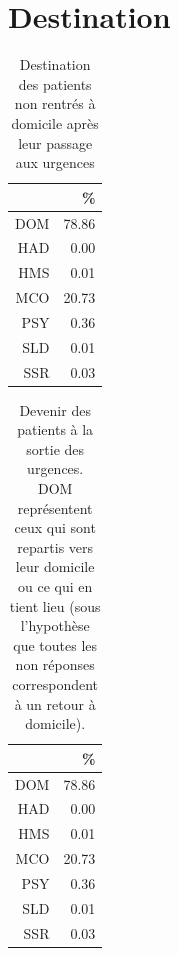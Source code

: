 \documentclass[12pt,english,french,twoside]{report}\usepackage[]{graphicx}\usepackage[]{color}
\begin{document}
\section{Destination}
\begin{table}[ht]
\centering
\begin{tabular}{rr}
  \hline
 & \% \\ 
  \hline
DOM & 78.86 \\ 
  HAD & 0.00 \\ 
  HMS & 0.01 \\ 
  MCO & 20.73 \\ 
  PSY & 0.36 \\ 
  SLD & 0.01 \\ 
  SSR & 0.03 \\ 
   \hline
\end{tabular}
\caption{Destination des patients non rentrés à domicile après leur passage aux urgences} 
\label{tab.dest.hosp}
\end{table}
\begin{table}[ht]
\centering
\begin{tabular}{rr}
  \hline
 & \% \\ 
  \hline
DOM & 78.86 \\ 
  HAD & 0.00 \\ 
  HMS & 0.01 \\ 
  MCO & 20.73 \\ 
  PSY & 0.36 \\ 
  SLD & 0.01 \\ 
  SSR & 0.03 \\ 
   \hline
\end{tabular}
\caption{Devenir des patients à la sortie des urgences. DOM représentent ceux qui sont repartis vers leur domicile ou ce qui en tient lieu (sous l'hypothèse que toutes les non réponses correspondent à un retour à domicile).} 
\label{tab.dest}
\end{table}
\end{document}
